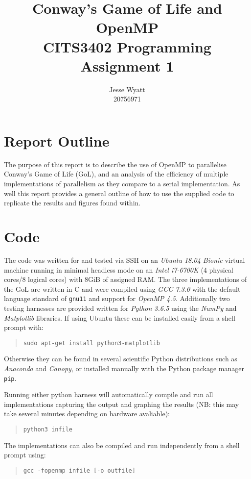 \documentclass[]{article}
\title{Conway's Game of Life and OpenMP\\
\large CITS3402 Programming Assignment 1}
\author{Jesse Wyatt\\20756971}
\begin{document}
\maketitle

\section{Report Outline}
The purpose of this report is to describe the use of OpenMP to parallelise Conway's Game of Life (GoL), and an analysis of the efficiency of multiple implementations of parallelism as they compare to a serial implementation. As well this report provides a general outline of how to use the supplied code to replicate the results and figures found within.

\section{Code}
The code was written for and tested via SSH on an \textit{Ubuntu 18.04 Bionic} virtual machine running in minimal headless mode on an \textit{Intel i7-6700K} (4 physical cores/8 logical cores) with 8GiB of assigned RAM. The three implementations of the GoL are written in C and were compiled using \textit{GCC 7.3.0} with the default language standard of \texttt{gnu11} and support for \textit{OpenMP 4.5}. Additionally two testing harnesses are provided written for \textit{Python 3.6.5} using the \textit{NumPy} and \textit{Matplotlib} libraries. If using Ubuntu these can be installed easily from a shell prompt with:
\begin{quote}
	\texttt{sudo apt-get install python3-matplotlib}
\end{quote}
Otherwise they can be found in several scientific Python distributions such as \textit{Anaconda} and \textit{Canopy}, or installed manually with the Python package manager \texttt{pip}.

Running either python harness will automatically compile and run all implementations capturing the output and graphing the results (NB: this may take several minutes depending on hardware avaliable):
\begin{quote}
\texttt{python3 infile}
\end{quote}

The implementations can also be compiled and run independently from a shell prompt using:
\begin{quote}
\texttt{gcc -fopenmp infile [-o outfile]}
\end{quote}
\end{document}
